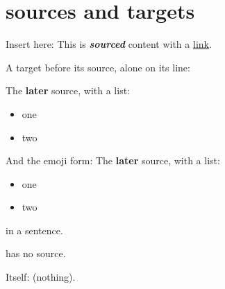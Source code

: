 \section{sources and targets}

Insert here: This is \textbf{\emph{sourced}} content with a \href{https://example.com}{link}.

A target before its source, alone on its line:

The \textbf{later} source, with a list:

\begin{itemize}
\item one
\item two
\end{itemize}

And the emoji form: The \textbf{later} source, with a list:

\begin{itemize}
\item one
\item two
\end{itemize} in a sentence.

 has no source.

Itself:  (nothing).


